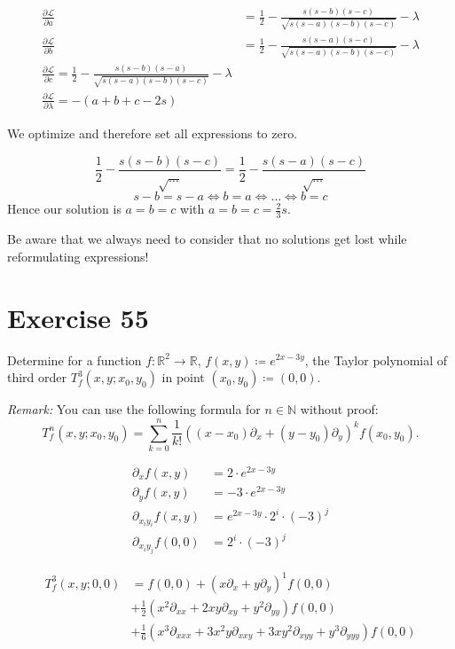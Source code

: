 \documentclass[a4paper]{article}
\theoremstyle{definition}
\begin{document}
\begin{align*}
  \frac{\partial \mathcal{L}}{\partial a} &= \frac12 - \frac{s (s-b) (s-c)}{\sqrt{s (s-a) (s-b) (s-c)}} - \lambda \\
  \frac{\partial \mathcal{L}}{\partial b} &= \frac{1}{2} - \frac{s (s-a) (s-c)}{\sqrt{s (s-a) (s-b) (s-c)}} - \lambda \\
  \frac{\partial \mathcal{L}}{\partial c}  = \frac12 - \frac{s (s-b) (s-a)}{\sqrt{s (s-a) (s-b) (s-c)}} - \lambda \\
  \frac{\partial \mathcal{L}}{\partial \lambda} = -(a + b + c - 2s)
\end{align*}

We optimize and therefore set all expressions to zero.

\[ \frac12 - \frac{s (s-b) (s-c)}{\sqrt{\ldots}} = \frac12 - \frac{s (s-a) (s-c)}{\sqrt{\ldots}} \]
\[ s - b = s - a \iff b = a \iff \ldots \iff b = c \]
Hence our solution is $a = b = c$ with $a = b = c = \frac23s$.

Be aware that we always need to consider that no solutions get lost while reformulating expressions!

\section{Exercise 55}
\begin{ex}
  Determine for a function $f: \mathbb R^2 \to \mathbb R$, $f(x,y) \coloneqq e^{2x-3y}$,
  the Taylor polynomial of third order $T_f^3(x, y; x_0, y_0)$ in point $(x_0, y_0) \coloneqq (0, 0)$.

  \emph{Remark:} You can use the following formula for $n \in \mathbb N$ without proof:
  \[ T_f^n(x, y; x_0, y_0) = \sum_{k=0}^n \frac1{k!} \left((x - x_0) \partial_x + (y - y_0) \partial_y\right)^k f(x_0, y_0). \]
\end{ex}

\begin{align*}
  \partial_x f(x, y) &= 2 \cdot e^{2x - 3y} \\
  \partial_y f(x, y) &= -3 \cdot e^{2x - 3y} \\
  \partial_{x_i y_i} f(x, y) &= e^{2x - 3y} \cdot 2^i \cdot (-3)^j \\
  \partial_{x_i y_j} f(0, 0) &= 2^i \cdot (-3)^j
\end{align*}

\begin{align*}
  T_f^3(x, y; 0, 0) &= f(0, 0) + (x \partial_x + y \partial_y)^1 f(0, 0) \\
  &+ \frac12 \left(x^2 \partial_{xx} + 2xy \partial_{xy} + y^2 \partial_{yy}\right) f(0, 0) \\
  &+ \frac16 \left(x^3 \partial_{xxx} + 3x^2 y \partial_{xxy} + 3xy^2 \partial_{xyy} + y^3 \partial_{yyy}\right) f(0, 0)
\end{align*}
\end{document}
